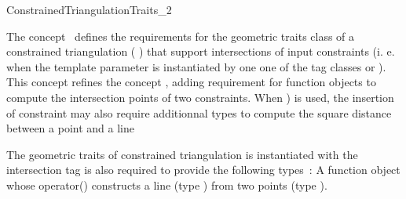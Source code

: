 

\begin{ccRefConcept}{ConstrainedTriangulationTraits_2}


\ccDefinition
  
The concept \ccRefName\ defines the requirements for the geometric
traits class of a constrained triangulation
( )
that support intersections of input constraints (i. e.
when the template parameter  is instantiated
by one one of the tag classes  or
). This concept refines the concept
, adding requirement for function objects
to compute the intersection points of two constraints.
When ) is used, the insertion of constraint may
also require additionnal types
to compute the square distance between a point and a line


\ccGeneralizes
{} 


\ccTypes


The geometric traits of  constrained triangulation is instantiated with
the intersection tag 
is also required to provide the following types~:
\ccGlue
{} {A function object whose operator()
constructs a line (type ) from two points
(type ).}
\ccGlue
{}



\end{ccRefConcept}
